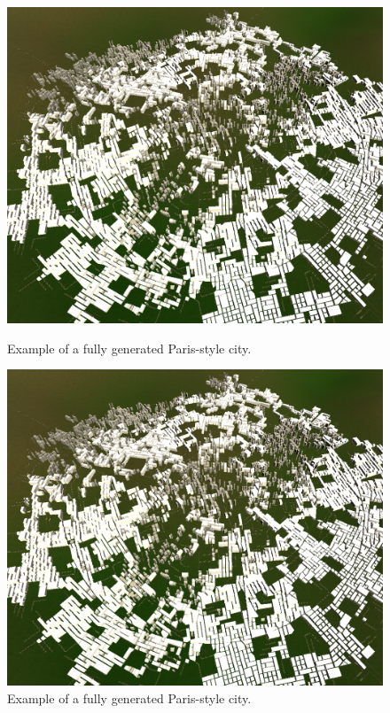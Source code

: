 \begin{figure}[H]
  \centering
  \begin{minipage}{.45\textwidth}
    \centering
    \begin{minipage}{.9\textwidth}
      \centering
      \includegraphics[width=\textwidth]{figure/results/city_paris.png}
      \caption{Example of a fully generated Paris-style city.}
      \label{fig:results_real_city_paris}
    \end{minipage}
  \end{minipage}
  \begin{minipage}{.45\textwidth}
    \begin{minipage}{.9\textwidth}
      \centering
      \centering
      \includegraphics[width=\textwidth]{figure/results/city_paris.png}
      \caption{Example of a fully generated Paris-style city.}
      \label{fig:results_city_paris}
    \end{minipage}
  \end{minipage}
\end{figure}


